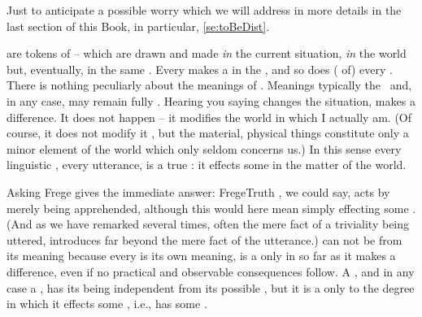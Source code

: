 
\pa Just to anticipate a possible worry which we will address in more details in
the last section of this Book, in particular, \ref{se:toBeDist}.

 are  tokens of  -- 
which are drawn and made {\em in} the current situation, {\em in} the world but,
eventually, in the same . Every  makes a
 in the , and so does ( of) every
.  There is nothing peculiarly  about the meanings of
.
Meanings typically  the \hoa\ and, in any case, may remain fully
.  Hearing you saying 
changes the  situation, makes a difference. 
It does not happen  -- it
modifies the world in which I actually am. (Of course, it does not modify it
, but the material, physical things constitute only a minor
element of the world which only seldom concerns us.) In this sense every
linguistic , every utterance, is a true : it effects
some  in the matter of the world.

Asking  Frege gives the immediate answer: \citet{By
  being apprehended and taken to be true.}{FregeTruth}{\kilde{[p.104]}}
, we could say, acts by merely being apprehended, although this
would here mean simply effecting some . (And as we have remarked
several times, often the mere fact of a triviality being uttered, introduces
 far beyond the mere fact of the utterance.) 
can not be  from its meaning because every  is
its own meaning, is a  only in so far as it makes a difference,
even if no practical and observable consequences follow. A , and in any
case a , has its being independent from its possible
, but it is a  only to the degree in which it effects some
, i.e., has some .

